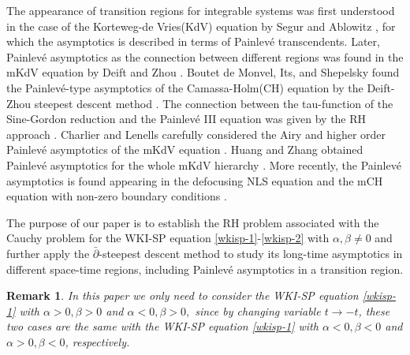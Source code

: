 \documentclass[11pt]{article}
\numberwithin{equation}{section}
\newtheorem{remark}{Remark}
\begin{document}
The appearance of transition   regions for integrable systems was first understood in the case of the Korteweg-de Vries(KdV)   equation by Segur and Ablowitz \cite{AblwzP1}, for which the asymptotics is described in terms of Painlev\'e
transcendents.  Later,  Painlev\'e asymptotics   as the connection between different regions was found in  the mKdV   equation   by Deift and Zhou   \cite{zhou-1993}.
Boutet de Monvel, Its, and Shepelsky found the Painlev\'{e}-type asymptotics  of the Camassa-Holm(CH)   equation by the Deift-Zhou steepest descent method \cite{Monvel}.
The connection  between    the  tau-function of the Sine-Gordon  reduction and the Painlev\'e III equation was given   by the RH  approach \cite{Its3}.
 Charlier and   Lenells carefully  considered the Airy and higher order Painlev\'{e} asymptotics  {of} the mKdV equation  \cite{Charlier}.
    Huang and  Zhang  obtained
  Painlev\'{e} asymptotics   for the whole  mKdV hierarchy \cite{Huanglin}. More recently,  the Painlev\'e asymptotics is found appearing in   the defocusing NLS  equation  and the mCH equation with non-zero boundary conditions   \cite{wfp,xyz}.

The purpose of our paper is  to establish the  RH problem   associated with the Cauchy problem for the WKI-SP equation   \eqref{wkisp-1}-\eqref{wkisp-2} with $\alpha, \beta \not=0$ and further  apply the $\bar\partial$-steepest descent method to study its  long-time asymptotics    in different space-time regions, including Painlev\'e asymptotics in a transition region.

\begin{remark}
In this paper we only need to  consider the WKI-SP equation \eqref{wkisp-1}  with  $\alpha>0,\beta>0$ and   $\alpha<0, \beta>0,$ since   by changing variable  $t\to -t$,  these two cases are the same with  the WKI-SP equation \eqref{wkisp-1}  with    $ \alpha <0, \beta <0$  and  $ \alpha > 0, \beta<0$, respectively.
\end{remark}
\end{document}

